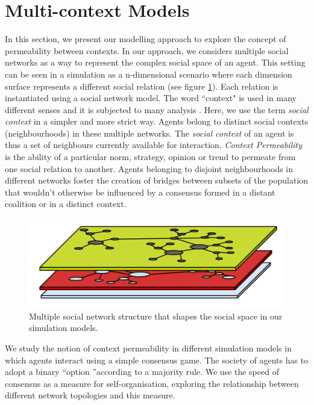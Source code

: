 \documentclass[preprint,number]{elsarticle}
\begin{document}
	
	\section{Multi-context Models}
	\label{sec:multi-context-models}
	In this section, we present our modelling approach to explore the concept of permeability between contexts. In our approach, we considers multiple social networks as a way to represent the complex social space of an agent. This setting can be seen in a simulation as a n-dimensional scenario where each dimension surface represents a different social relation (see figure \ref{img:multiple-relations}). Each relation is instantiated using a social network model. The word ``context" is used in many different senses and it is subjected to many analysis \cite{Hayes1997}. Here, we use the term \textit{social context} in a simpler and more strict way. Agents belong to distinct social contexts (neighbourhoods) in these multiple networks. The \textit{social context} of an agent is thus a set of neighbours currently available for interaction. \textit{Context Permeability} is the ability of a particular norm, strategy, opinion or trend to permeate from one social relation to another. Agents belonging to disjoint neighbourhoods in different networks foster the creation of bridges between subsets of the population that wouldn't otherwise be influenced by a consensus formed in a distant coalition or in a distinct context. 
	
	
	
	\begin{figure}[h]
		\centering
		\includegraphics[width=0.7\linewidth]{./images/multi-context_model.pdf}
		\begin{minipage}{0.9\linewidth}
			\caption{Multiple social network structure that shapes the social space in our simulation models.}
			\label{img:multiple-relations}
		\end{minipage}
	\end{figure}
	
	We study the notion of context permeability in different simulation models in which agents interact using a simple consensus game. The society of agents has to adopt a binary \textquotedblleft option \textquotedblright according to a majority rule. We use the speed of consensus as a measure for self-organisation, exploring the relationship between different network topologies and this measure.
	
\end{document}
